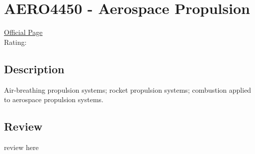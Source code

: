 \hypertarget{AERO4450}{\section{AERO4450 - Aerospace Propulsion}}

\large
\textcolor{turbo_purple}{\href{https://my.uq.edu.au/programs-courses/course.html?course_code=AERO4450}{Official Page}} \\
Rating: \cstar\cstar\cstar\cstar\ostar

\normalsize
\subsection*{Description}
Air-breathing propulsion systems; rocket propulsion systems; combustion applied to aerospace propulsion systems.

\subsection*{Review}
review here
